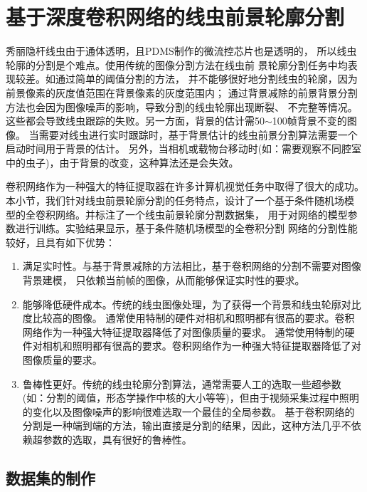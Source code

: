 \section{基于深度卷积网络的线虫前景轮廓分割}
秀丽隐杆线虫由于通体透明，且PDMS制作的微流控芯片也是透明的，
所以线虫轮廓的分割是个难点。使用传统的图像分割方法在线虫前
景轮廓分割任务中均表现较差。如通过简单的阈值分割的方法，
并不能够很好地分割线虫的轮廓，因为前景像素的灰度值范围在背景像素的灰度范围内；
通过背景减除的前景背景分割方法也会因为图像噪声的影响，导致分割的线虫轮廓出现断裂、
不完整等情况。这些都会导致线虫跟踪的失败。另一方面，背景的估计需50$\sim$100帧背景不变的图像。
当需要对线虫进行实时跟踪时，基于背景估计的线虫前景分割算法需要一个启动时间用于背景的估计。
另外，当相机或载物台移动时(如：需要观察不同腔室中的虫子)，由于背景的改变，这种算法还是会失效。

卷积网络作为一种强大的特征提取器在许多计算机视觉任务中取得了很大的成功。
本小节，我们针对线虫前景轮廓分割的任务特点，设计了一个基于条件随机场模
型的全卷积网络。并标注了一个线虫前景轮廓分割数据集，
用于对网络的模型参数进行训练。实验结果显示，基于条件随机场模型的全卷积分割
网络的分割性能较好，且具有如下优势：
	
\begin{enumerate}
  \item 满足实时性。与基于背景减除的方法相比，基于卷积网络的分割不需要对图像背景建模，
  只依赖当前帧的图像，从而能够保证实时性的要求。
  \item 能够降低硬件成本。传统的线虫图像处理，为了获得一个背景和线虫轮廓对比度比较高的图像。
  通常使用特制的硬件对相机和照明都有很高的要求。卷积网络作为一种强大特征提取器降低了对图像质量的要求。
  通常使用特制的硬件对相机和照明都有很高的要求。卷积网络作为一种强大特征提取器降低了对图像质量的要求。
  \item 鲁棒性更好。传统的线虫轮廓分割算法，通常需要人工的选取一些超参数(如：分割的阈值，形态学操作中核的大小等等)，但由于视频采集过程中照明的变化以及图像噪声的影响很难选取一个最佳的全局参数。
基于卷积网络的分割是一种端到端的方法，输出直接是分割的结果，因此，这种方法几乎不依赖超参数的选取，具有很好的鲁棒性。
\end{enumerate}
\subsection{数据集的制作}
